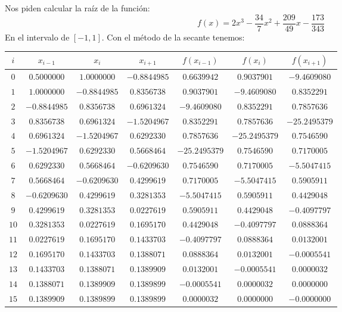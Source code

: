 
Nos piden calcular la raíz de la función:
\begin{equation*}
	f(x) = 2x^3 - \frac{34}{7} x^2 + \frac{209}{49}x - \frac{173}{343}
\end{equation*}
En el intervalo de $\left[ -1, 1 \right]$.
Con el método de la secante tenemos: 

\begin{center}
	\begin{longtable}{|c|c|c|c|c|c|c|} \hline
		$i$ & $x_{i-1}$ & $x_{i}$ & $x_{i+1}$ & $f(x_{i-1})$ & $f(x_{i})$ & $f(x_{i+1})$ \\ \hline
		$0$ & $0.5000000$ & $1.0000000$ & $-0.8844985$ & $0.6639942$ & $0.9037901$ & $-9.4609080$ \\ \hline
		$1$ & $1.0000000$ & $-0.8844985$ & $0.8356738$ & $0.9037901$ & $-9.4609080$ & $0.8352291$ \\ \hline
		$2$ & $-0.8844985$ & $0.8356738$ & $0.6961324$ & $-9.4609080$ & $0.8352291$ & $0.7857636$ \\ \hline
		$3$ & $0.8356738$ & $0.6961324$ & $-1.5204967$ & $0.8352291$ & $0.7857636$ & $-25.2495379$ \\ \hline
		$4$ & $0.6961324$ & $-1.5204967$ & $0.6292330$ & $0.7857636$ & $-25.2495379$ & $0.7546590$ \\ \hline
		$5$ & $-1.5204967$ & $0.6292330$ & $0.5668464$ & $-25.2495379$ & $0.7546590$ & $0.7170005$ \\ \hline
		$6$ & $0.6292330$ & $0.5668464$ & $-0.6209630$ & $0.7546590$ & $0.7170005$ & $-5.5047415$ \\ \hline
		$7$ & $0.5668464$ & $-0.6209630$ & $0.4299619$ & $0.7170005$ & $-5.5047415$ & $0.5905911$ \\ \hline
		$8$ & $-0.6209630$ & $0.4299619$ & $0.3281353$ & $-5.5047415$ & $0.5905911$ & $0.4429048$ \\ \hline
		$9$ & $0.4299619$ & $0.3281353$ & $0.0227619$ & $0.5905911$ & $0.4429048$ & $-0.4097797$ \\ \hline
		$10$ & $0.3281353$ & $0.0227619$ & $0.1695170$ & $0.4429048$ & $-0.4097797$ & $0.0888364$ \\ \hline
		$11$ & $0.0227619$ & $0.1695170$ & $0.1433703$ & $-0.4097797$ & $0.0888364$ & $0.0132001$ \\ \hline
		$12$ & $0.1695170$ & $0.1433703$ & $0.1388071$ & $0.0888364$ & $0.0132001$ & $-0.0005541$ \\ \hline
		$13$ & $0.1433703$ & $0.1388071$ & $0.1389909$ & $0.0132001$ & $-0.0005541$ & $0.0000032$ \\ \hline
		$14$ & $0.1388071$ & $0.1389909$ & $0.1389899$ & $-0.0005541$ & $0.0000032$ & $0.0000000$ \\ \hline
		$15$ & $0.1389909$ & $0.1389899$ & $0.1389899$ & $0.0000032$ & $0.0000000$ & $-0.0000000$ \\ \hline
	\end{longtable}
\end{center}



